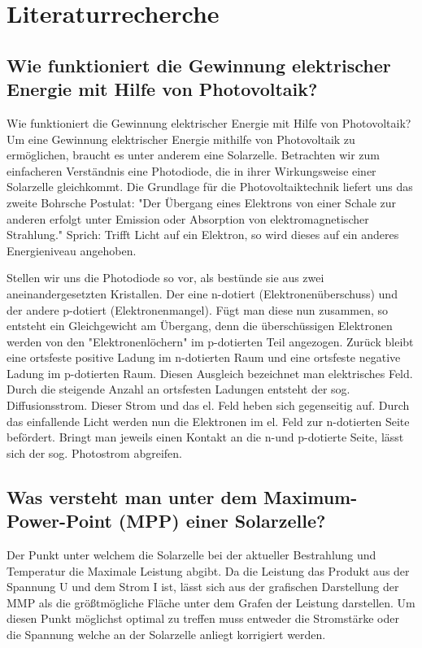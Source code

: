 \documentclass[a4paper,12pt]{article}
\title{}
\author{}
\date{}
\begin{document}
\maketitle

\section{Literaturrecherche}
\subsection{Wie funktioniert die Gewinnung elektrischer Energie mit Hilfe von Photovoltaik?}
Wie funktioniert die Gewinnung elektrischer Energie mit Hilfe von Photovoltaik?\\
Um eine Gewinnung elektrischer Energie mithilfe von Photovoltaik zu ermöglichen, braucht es unter anderem eine Solarzelle. Betrachten wir zum einfacheren Verständnis eine Photodiode, die in ihrer Wirkungsweise einer Solarzelle gleichkommt. 
Die Grundlage für die Photovoltaiktechnik liefert uns das zweite Bohrsche Postulat: "Der Übergang eines Elektrons von einer Schale zur anderen erfolgt unter Emission oder Absorption von elektromagnetischer Strahlung." Sprich: Trifft Licht auf ein Elektron, so wird dieses auf ein anderes Energieniveau angehoben. 

Stellen wir uns die Photodiode so vor, als bestünde sie aus zwei aneinandergesetzten Kristallen. Der eine n-dotiert (Elektronenüberschuss) und der andere p-dotiert (Elektronenmangel). Fügt man diese nun zusammen, so entsteht ein Gleichgewicht am Übergang, denn die überschüssigen Elektronen werden von den "Elektronenlöchern" im p-dotierten Teil angezogen. Zurück bleibt eine ortsfeste positive Ladung im n-dotierten Raum und eine ortsfeste negative Ladung im p-dotierten Raum. Diesen Ausgleich bezeichnet man elektrisches Feld. Durch die steigende Anzahl an ortsfesten Ladungen entsteht der sog. Diffusionsstrom. Dieser Strom und das el. Feld heben sich gegenseitig auf.
Durch das einfallende Licht werden nun die Elektronen im el. Feld zur n-dotierten Seite befördert. Bringt man jeweils einen Kontakt an die n-und p-dotierte Seite, lässt sich der sog. Photostrom abgreifen. 
\subsection{Was versteht man unter dem Maximum-Power-Point (MPP) einer Solarzelle?}
Der Punkt unter welchem die Solarzelle bei der aktueller Bestrahlung und Temperatur die Maximale Leistung abgibt. Da die Leistung das Produkt aus der Spannung U und dem Strom I ist, lässt sich aus der grafischen Darstellung der MMP als die größtmögliche Fläche unter dem Grafen der Leistung darstellen. Um diesen Punkt möglichst optimal zu treffen muss entweder die Stromstärke oder die Spannung welche an der Solarzelle anliegt korrigiert werden.
\end{document}
